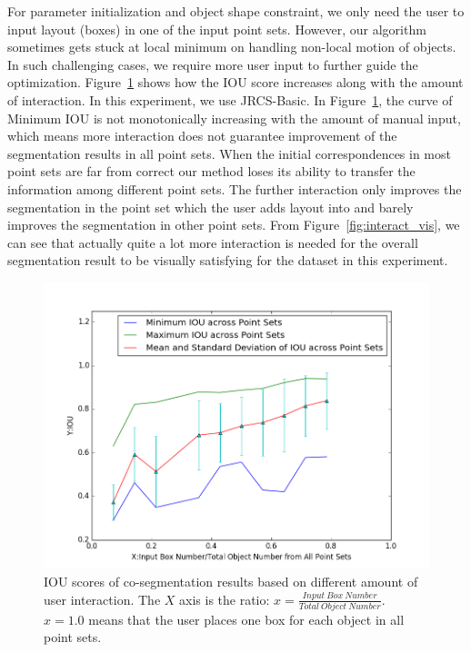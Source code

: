 For parameter initialization and object shape constraint, we only need the user to input layout (boxes) in one of the input point sets. However, our algorithm sometimes gets stuck at local minimum on handling non-local motion of objects. In such challenging cases, we require more user input to further guide the optimization. Figure~\ref{fig:interact_number} shows how the IOU score increases along with the amount of interaction. In this experiment, we use JRCS-Basic. In Figure~\ref{fig:interact_number}, the curve of Minimum IOU is not monotonically increasing with the amount of manual input, which means more interaction does not guarantee improvement of the segmentation results in all point sets.  When the initial correspondences in most point sets are far from correct our method loses its ability to transfer the information among different point sets. The further interaction only improves the segmentation in the point set which the user adds layout into and barely improves the segmentation in other point sets.
From Figure~\ref{fig:interact_vis}, we can see that actually quite a lot more interaction is needed for the overall segmentation result to be visually satisfying for the dataset in this experiment.
 
\begin{figure}
	\centering
	\includegraphics[width=\linewidth]{images/interact/IOU.png}
	\caption{IOU scores of co-segmentation results based on different amount of user interaction. The $X$ axis is the ratio: $x=\frac{Input~Box~Number}{Total~Object~Number}$. $x=1.0$ means that the user places one box for each object in all point sets.}
	\label{fig:interact_number}
\end{figure}

